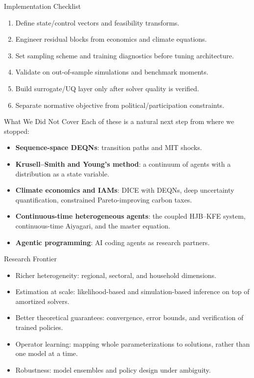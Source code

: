 \documentclass[aspectratio=169,11pt]{beamer}
\begin{document}
\begin{frame}{Implementation Checklist}
\small
\begin{enumerate}
    \item Define state/control vectors and feasibility transforms.
    \item Engineer residual blocks from economics and climate equations.
    \item Set sampling scheme and training diagnostics before tuning architecture.
    \item Validate on out-of-sample simulations and benchmark moments.
    \item Build surrogate/UQ layer only after solver quality is verified.
    \item Separate normative objective from political/participation constraints.
\end{enumerate}
\end{frame}


\begin{frame}{What We Did Not Cover}
\small
Each of these is a natural next step from where we stopped:
\begin{itemize}\itemsep4pt
  \item \textbf{Sequence-space DEQNs}: transition paths and MIT shocks.
  \item \textbf{Krusell--Smith and Young's method}: a continuum of agents with
        a distribution as a state variable.
  \item \textbf{Climate economics and IAMs}: DICE with DEQNs, deep uncertainty
        quantification, constrained Pareto-improving carbon taxes.
  \item \textbf{Continuous-time heterogeneous agents}: the coupled HJB--KFE system,
        continuous-time Aiyagari, and the master equation.
  \item \textbf{Agentic programming}: AI coding agents as research partners.
\end{itemize}
\end{frame}

\begin{frame}{Research Frontier}
\begin{itemize}\itemsep4pt
  \item Richer heterogeneity: regional, sectoral, and household dimensions.
  \item Estimation at scale: likelihood-based and simulation-based inference
        on top of amortized solvers.
  \item Better theoretical guarantees: convergence, error bounds, and
        verification of trained policies.
  \item Operator learning: mapping whole parameterizations to solutions,
        rather than one model at a time.
  \item Robustness: model ensembles and policy design under ambiguity.
\end{itemize}
\end{frame}
\end{document}

